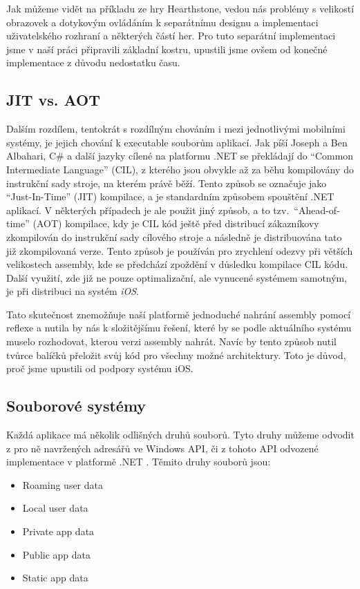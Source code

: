 Jak můžeme vidět na příkladu ze hry Hearthstone\citep{site:hearthstone}, vedou nás problémy s velikostí obrazovek a dotykovým ovládáním k separátnímu designu a implementaci uživatelského rozhraní a některých částí her. Pro tuto separátní implementaci jsme v naší práci připravili základní kostru, upustili jsme ovšem od konečné implementace z důvodu nedostatku času.

\subsection{JIT vs. AOT}
Dalším rozdílem, tentokrát s rozdílným chováním i mezi jednotlivými mobilními systémy, je jejich chování k executable souborům aplikací. Jak píší Joseph a Ben Albahari\citep{book:cs7nutshell}, C\# a další jazyky cílené na platformu .NET se překládají do ``Common Intermediate Language'' (CIL), z kterého jsou obvykle až za běhu kompilovány do instrukční sady stroje, na kterém právě běží. Tento způsob se označuje jako ``Just-In-Time'' (JIT) kompilace, a je standardním způsobem spouštění .NET aplikací. V některých případech je ale použit jiný způsob, a to tzv.~``Ahead-of-time'' (AOT) kompilace, kdy je CIL kód ještě před distribucí zákazníkovy zkompilován do instrukční sady cílového stroje a následně je distribuována tato již zkompilovaná verze. Tento způsob je používán pro zrychlení odezvy při větších velikostech assembly, kde se předchází zpoždění v důsledku kompilace CIL kódu. Další využití, zde již ne pouze optimalizační, ale vynucené systémem samotným, je při distribuci na systém \emph{iOS}\citep{site:aot}. 

Tato skutečnost znemožňuje naší platformě jednoduché nahrání assembly pomocí reflexe a nutila by nás k složitějšímu řešení, které by se podle aktuálního systému muselo rozhodovat, kterou verzi assembly nahrát. Navíc by tento způsob nutil tvůrce balíčků přeložit svůj kód pro všechny možné architektury. Toto je důvod, proč jsme upustili od podpory systému iOS.

\subsection{Souborové systémy}
\label{sec:platmobfile}
Každá aplikace má několik odlišných druhů souborů. Tyto druhy můžeme odvodit z pro ně navržených adresářů ve Windows API\citep{site:knownfolders}, či z tohoto API odvozené implementace v platformě .NET \citep{site:specialfolders}. Těmito druhy souborů jsou:
\begin{itemize}
	\item Roaming user data
	\item Local user data
	\item Private app data
	\item Public app data
	\item Static app data
\end{itemize} 


